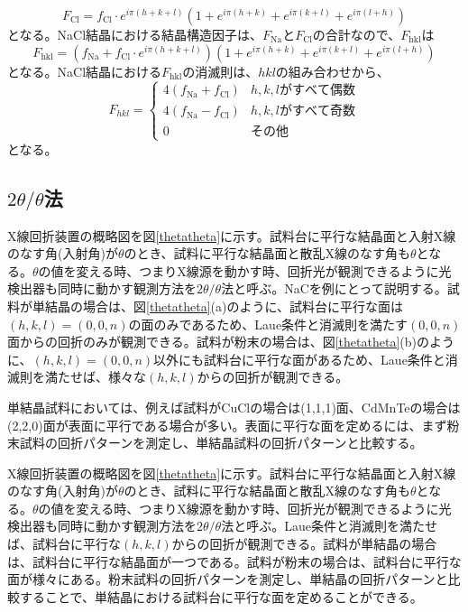 \documentclass[11pt,a4j,uplatex]{jsarticle}
\begin{document}
\begin{equation}
 F_{\mathrm{Cl}}=f_{\mathrm{Cl}}\cdot e^{i\pi(h+k+l)}(1+e^{i\pi(h+k)}+e^{i\pi(k+l)}+e^{i\pi(l+h)})
\end{equation}
となる。NaCl結晶における結晶構造因子は、$F_{\mathrm{Na}}$と$F_{\mathrm{Cl}}$の合計なので、$F_{\mathrm{hkl}}$は
\begin{equation}
 F_{\mathrm{hkl}}=(f_{\mathrm{Na}}+f_{\mathrm{Cl}}\cdot e^{i\pi(h+k+l)})(1+e^{i\pi(h+k)}+e^{i\pi(k+l)}+e^{i\pi(l+h)})
\end{equation}
となる。NaCl結晶における$F_{\mathrm{hkl}}$の消滅則は、$hkl$の組み合わせから、
\begin{subequations}
 \begin{equation}
  F_{hkl}=\begin{cases}
   4(f_{\mathrm{Na}}+f_{\mathrm{Cl}}) & h,k,lがすべて偶数 \\
   4(f_{\mathrm{Na}}-f_{\mathrm{Cl}}) & h,k,lがすべて奇数 \\
   0                                  & その他
  \end{cases}
 \end{equation}
\end{subequations}
となる。
\newpage
\subsection{$2\theta/\theta$法}
 X線回折装置の概略図を図\ref{thetatheta}に示す。試料台に平行な結晶面と入射X線のなす角(入射角)が$\theta$のとき、試料に平行な結晶面と散乱X線のなす角も$\theta$となる。$\theta$の値を変える時、つまりX線源を動かす時、回折光が観測できるように光検出器も同時に動かす観測方法を$2\theta/\theta$法と呼ぶ。NaCを例にとって説明する。試料が単結晶の場合は、図\ref{thetatheta}(a)のように、試料台に平行な面は$(h,k,l)=(0,0,n)$の面のみであるため、Laue条件と消滅則を満たす$(0,0,n)$面からの回折のみが観測できる。試料が粉末の場合は、図\ref{thetatheta}(b)のように、$(h,k,l)=(0,0,n)$以外にも試料台に平行な面があるため、Laue条件と消滅則を満たせば、様々な$(h,k,l)$からの回折が観測できる。

 単結晶試料においては、例えば試料がCuClの場合は(1,1,1)面、CdMnTeの場合は(2,2,0)面が表面に平行である場合が多い。表面に平行な面を定めるには、まず粉末試料の回折パターンを測定し、単結晶試料の回折パターンと比較する。
\fi

X線回折装置の概略図を図\ref{thetatheta}に示す。試料台に平行な結晶面と入射X線のなす角(入射角)が$\theta$のとき、試料に平行な結晶面と散乱X線のなす角も$\theta$となる。$\theta$の値を変える時、つまりX線源を動かす時、回折光が観測できるように光検出器も同時に動かす観測方法を$2\theta/\theta$法と呼ぶ。Laue条件と消滅則を満たせば、試料台に平行な$(h,k,l)$からの回折が観測できる。試料が単結晶の場合は、試料台に平行な結晶面が一つである。試料が粉末の場合は、試料台に平行な面が様々にある。粉末試料の回折パターンを測定し、単結晶の回折パターンと比較することで、単結晶における試料台に平行な面を定めることができる。
\end{document}

